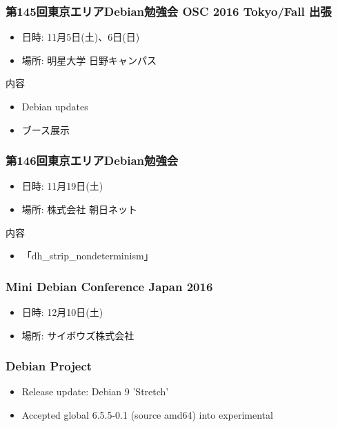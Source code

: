 \documentclass[cjk,dvipdfmx,10pt,compress,%
hyperref={bookmarks=true,bookmarksnumbered=true,bookmarksopen=false,%
colorlinks=false,%
pdftitle={第 117 回 関西 Debian 勉強会},%
pdfauthor={倉敷・のがた・佐々木・かわだ・おおつき},%
pdfsubject={資料},%
}]{beamer}
\begin{document}
\begin{frame}[fragile]
  \frametitle{第145回東京エリアDebian勉強会 OSC 2016 Tokyo/Fall 出張}
  \begin{itemize}
  \item 日時: 11月5日(土)、6日(日)
  \item 場所: 明星大学 日野キャンパス
  \end{itemize}
  \begin{block}{内容}
    \begin{itemize}
    \item Debian updates
    \item ブース展示
    \end{itemize}
  \end{block}
\end{frame}

\begin{frame}[fragile]
  \frametitle{第146回東京エリアDebian勉強会}
  \begin{itemize}
  \item 日時: 11月19日(土)
  \item 場所: 株式会社 朝日ネット
  \end{itemize}
  \begin{block}{内容}
    \begin{itemize}
    \item 「dh\_strip\_nondeterminism」
    \end{itemize}
  \end{block}
\end{frame}

\begin{frame}[fragile]
  \frametitle{Mini Debian Conference Japan 2016}
  \begin{itemize}
  \item 日時: 12月10日(土)
  \item 場所: サイボウズ株式会社
  \end{itemize}
\end{frame}

\begin{frame}[fragile]
  \frametitle{Debian Project}
  \begin{itemize}
  \item Release update: Debian 9 'Stretch'
  \item Accepted global 6.5.5-0.1 (source amd64) into experimental
  \end{itemize}
\end{frame}

\end{document}
